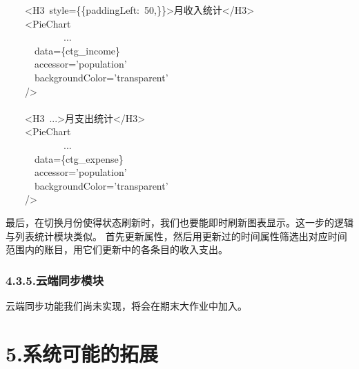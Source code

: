 \documentclass{article}
\begin{document}
\begin{mdpre}%
\noindent~~~~\textless{}H3~style=\{\{paddingLeft:~{50},\}\}\textgreater{}月收入统计\textless{}/H3\textgreater{}\\
~~~~\textless{}PieChart\\
~~~~~~~~~~~~...\\
~~~~~~data=\{ctg\_income\}\\
~~~~~~accessor={'}{population}{'}\\
~~~~~~backgroundColor={'}{transparent}{'}\\
~~~~/\textgreater{}\\
\\
~~~~\textless{}H3~...\textgreater{}月支出统计\textless{}/H3\textgreater{}\\
~~~~\textless{}PieChart\\
~~~~~~~~~~~~...\\
~~~~~~data=\{ctg\_expense\}\\
~~~~~~accessor={'}{population}{'}\\
~~~~~~backgroundColor={'}{transparent}{'}\\
~~~~/\textgreater{}%
\end{mdpre}\noindent{}最后，在切换月份使得状态刷新时，我们也要能即时刷新图表显示。这一步的逻辑与列表统计模块类似。
首先更新属性，然后用更新过的时间属性筛选出对应时间范围内的账目，用它们更新中的各条目的收入支出。

\subsubsection{4.3.5.\hspace*{0.5em}云端同步模块}\label{section}%

\noindent{}云端同步功能我们尚未实现，将会在期末大作业中加入。%

\section{5.\hspace*{0.5em}系统可能的拓展}\label{section}%
\end{document}
